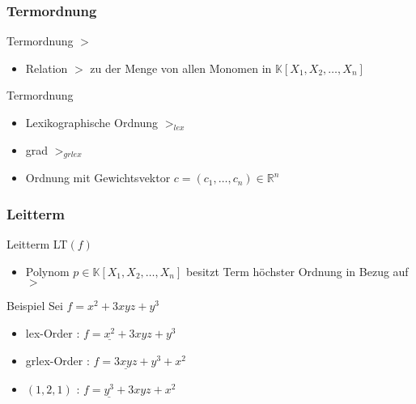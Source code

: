 \documentclass{beamer}
\begin{document}
\begin{frame}[fragile]
\frametitle{Termordnung}
\begin{block}{Termordnung $>$}
\begin{itemize}
\item Relation $>$ zu der Menge von allen Monomen in $ \mathbb{K} \left[X_{1},X_{2},\dots, X_{n}\right]  $ 
\end{itemize}



\end{block}

\begin{block}{Termordnung }
\begin{itemize}
\item Lexikographische Ordnung $>_{lex}$
\item grad $>_{grlex}$
\item Ordnung mit Gewichtsvektor $c = (c_1, \ldots , c_n ) \in \mathbb{R}^{n}$
\end{itemize}



\end{block}


\end{frame}
\begin{frame}[fragile]
\frametitle{Leitterm}

\begin{block}{Leitterm \textsc{LT}$(f)$ }
\begin{itemize}
\item Polynom $p \in  \mathbb{K} \left[X_{1},X_{2},\dots, X_{n}\right] $  besitzt Term höchster Ordnung in Bezug auf $>$
\end{itemize}

\end{block}


\begin{block}{Beispiel}
Sei $f = x^{2}+3xyz+y^{3} $
\begin{itemize}

\item lex-Order : $f = \underline{x^{2}} + 3xyz + y^{3}  $
\item grlex-Order :  $f = \underline{3xyz} + y^{3} + x^{2}  $
\item $\left(1,2,1\right)$ :  $f = \underline{y^{3}} + 3xyz + x^{2}  $
\end{itemize}

\end{block}


\end{frame}
\end{document}
